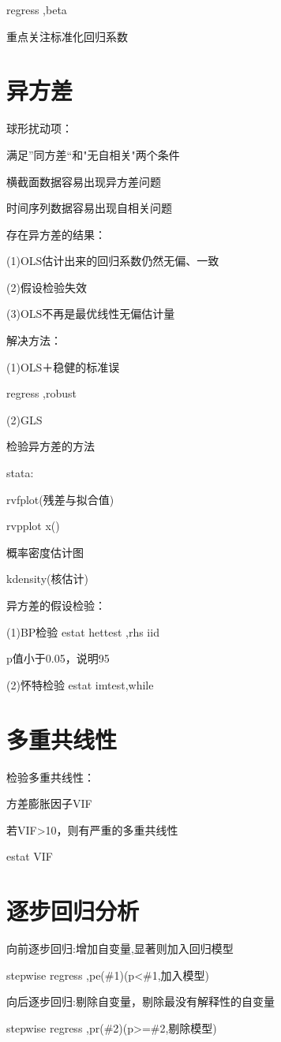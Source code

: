 \documentclass{article}
\begin{document}
regress      ,beta

重点关注标准化回归系数

\section{异方差}

球形扰动项：

满足”同方差“和"无自相关"两个条件

横截面数据容易出现异方差问题

时间序列数据容易出现自相关问题

存在异方差的结果：

(1)OLS估计出来的回归系数仍然无偏、一致

(2)假设检验失效

(3)OLS不再是最优线性无偏估计量

解决方法：

(1)OLS＋稳健的标准误

regress ,robust

(2)GLS

检验异方差的方法

stata:

rvfplot(残差与拟合值)

rvpplot x()

概率密度估计图

kdensity(核估计)

异方差的假设检验：

(1)BP检验 
estat hettest ,rhs iid

p值小于0.05，说明95%

(2)怀特检验
estat imtest,while

\section{多重共线性}

检验多重共线性：

方差膨胀因子VIF

若VIF>10，则有严重的多重共线性

estat VIF

\section{逐步回归分析}

向前逐步回归:增加自变量,显著则加入回归模型

stepwise regress ,pe(\#1)(p<\#1,加入模型)

向后逐步回归:剔除自变量，剔除最没有解释性的自变量

stepwise regress ,pr(\#2)(p>=\#2,剔除模型)
\end{document}
